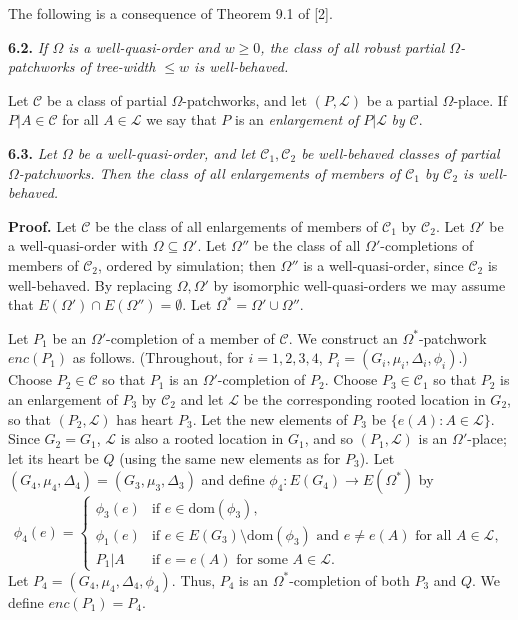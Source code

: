 The following is a consequence of Theorem 9.1 of [2].

\textbf{6.2.} \textit{If $\Omega$ is a well-quasi-order and $w \ge 0$, the class of all robust partial $\Omega$-patchworks of tree-width $\le w$ is well-behaved.}

Let $\mathscr{C}$ be a class of partial $\Omega$-patchworks, and let $(P, \mathscr{L})$ be a partial $\Omega$-place. If $P|A \in \mathscr{C}$ for all $A \in \mathscr{L}$ we say that $P$ is an \textit{enlargement of} $P|\mathscr{L}$ \textit{by} $\mathscr{C}$.

\textbf{6.3.} \textit{Let $\Omega$ be a well-quasi-order, and let $\mathscr{C}_1, \mathscr{C}_2$ be well-behaved classes of partial $\Omega$-patchworks. Then the class of all enlargements of members of $\mathscr{C}_1$ by $\mathscr{C}_2$ is well-behaved.}

\textbf{Proof.} Let $\mathscr{C}$ be the class of all enlargements of members of $\mathscr{C}_1$ by $\mathscr{C}_2$. Let $\Omega'$ be a well-quasi-order with $\Omega \subseteq \Omega'$. Let $\Omega''$ be the class of all $\Omega'$-completions of members of $\mathscr{C}_2$, ordered by simulation; then $\Omega''$ is a well-quasi-order, since $\mathscr{C}_2$ is well-behaved. By replacing $\Omega, \Omega'$ by isomorphic well-quasi-orders we may assume that $E(\Omega') \cap E(\Omega'') = \emptyset$. Let $\Omega^* = \Omega' \cup \Omega''$.

Let $P_1$ be an $\Omega'$-completion of a member of $\mathscr{C}$. We construct an $\Omega^*$-patchwork $enc(P_1)$ as follows. (Throughout, for $i = 1, 2, 3, 4$, $P_i = (G_i, \mu_i, \Delta_i, \phi_i)$.) Choose $P_2 \in \mathscr{C}$ so that $P_1$ is an $\Omega'$-completion of $P_2$. Choose $P_3 \in \mathscr{C}_1$ so that $P_2$ is an enlargement of $P_3$ by $\mathscr{C}_2$ and let $\mathscr{L}$ be the corresponding rooted location in $G_2$, so that $(P_2, \mathscr{L})$ has heart $P_3$. Let the new elements of $P_3$ be $\{e(A) \colon A \in \mathscr{L}\}$. Since $G_2 = G_1$, $\mathscr{L}$ is also a rooted location in $G_1$, and so $(P_1, \mathscr{L})$ is an $\Omega'$-place; let its heart be $Q$ (using the same new elements as for $P_3$). Let $(G_4, \mu_4, \Delta_4) = (G_3, \mu_3, \Delta_3)$ and define $\phi_4 \colon E(G_4) \to E(\Omega^*)$ by
\begin{equation*}
\phi_4(e) = \begin{cases}
\phi_3(e) & \text{if } e \in \text{dom}(\phi_3), \\
\phi_1(e) & \text{if } e \in E(G_3) \setminus \text{dom}(\phi_3) \text{ and } e \ne e(A) \text{ for all } A \in \mathscr{L}, \\
P_1|A & \text{if } e = e(A) \text{ for some } A \in \mathscr{L}.
\end{cases}
\end{equation*}
Let $P_4 = (G_4, \mu_4, \Delta_4, \phi_4)$. Thus, $P_4$ is an $\Omega^*$-completion of both $P_3$ and $Q$. We define $enc(P_1) = P_4$.

